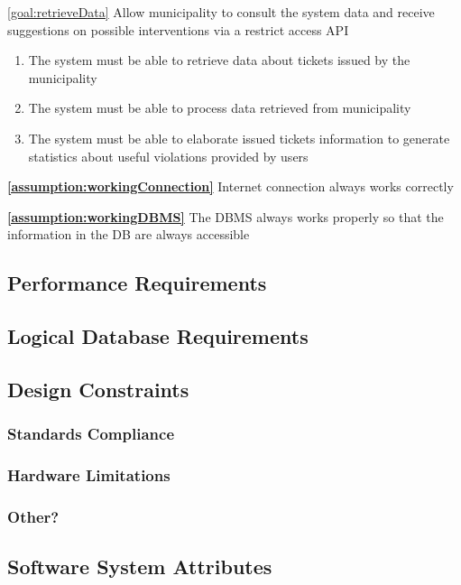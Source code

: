 \begin{description}
   		\item \ref{goal:retrieveData} Allow municipality to consult the system data and receive suggestions on possible interventions via a restrict access API 
   				\begin{enumerate}[resume*] 
  				\item The system must be able to retrieve data about tickets issued by the municipality 
   				\item The system must be able to process data retrieved from municipality
   				\item The system must be able to elaborate issued tickets information to generate statistics about useful violations provided by users
   			\end{enumerate}
   			
   			\textbf{\ref{assumption:workingConnection}} Internet connection always works correctly
   			
			\textbf{\ref{assumption:workingDBMS}} The DBMS always works properly so that the information in the DB are always accessible

   	\end{description}

\subsection{Performance Requirements}

\subsection{Logical Database Requirements}

\subsection{Design Constraints}

\subsubsection{Standards Compliance}
\subsubsection{Hardware Limitations}
\subsubsection{Other?}

\subsection{Software System Attributes}

